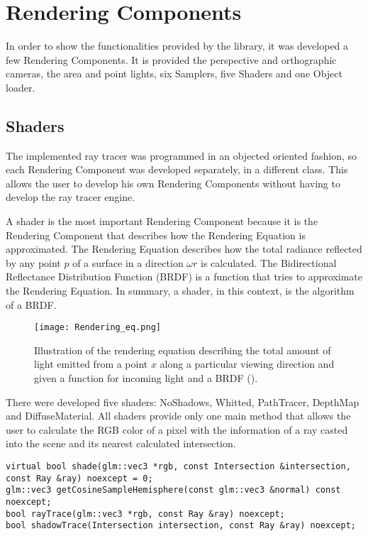 \section{Rendering Components}

\par
In order to show the functionalities provided by the library, it was developed a few Rendering Components.
It is provided the perspective and orthographic cameras, the area and point lights, six Samplers, five Shaders and one Object loader.

\subsection{Shaders}

\par
The implemented ray tracer was programmed in an objected oriented fashion, so each Rendering Component was developed separately, in a different class.
This allows the user to develop his own Rendering Components without having to develop the ray tracer engine.

\par
A shader is the most important Rendering Component because it is the Rendering Component that describes how the Rendering Equation is approximated.
The Rendering Equation describes how the total radiance reflected by any point
$p$
of a surface in a direction
$\omega$$r$
is calculated.
The Bidirectional Reflectance Distribution Function (BRDF) is a function that tries to approximate the Rendering Equation.
In summary, a shader, in this context, is the algorithm of a BRDF.

\begin{figure}[H]
	\centering
	\caption{Illustration of the rendering equation describing the total amount of light emitted from a point
	$x$
	along a particular viewing direction and given a function for incoming light and a BRDF (\cite{RenderingEquation}).}
	\label{Rendering_Equation.}
	\texttt{[image: Rendering\_eq.png]}
\end{figure}

\par
There were developed five shaders: NoShadows, Whitted, PathTracer, DepthMap and DiffuseMaterial.
All shaders provide only one main method that allows the user to calculate the RGB color of a pixel with the information of a ray casted into the scene and its nearest calculated intersection.

\begin{lstlisting}[caption={Main methods of Shader}, captionpos=b, label=Shader]
virtual bool shade(glm::vec3 *rgb, const Intersection &intersection, const Ray &ray) noexcept = 0;
glm::vec3 getCosineSampleHemisphere(const glm::vec3 &normal) const noexcept;
bool rayTrace(glm::vec3 *rgb, const Ray &ray) noexcept;
bool shadowTrace(Intersection intersection, const Ray &ray) noexcept;
\end{lstlisting}

